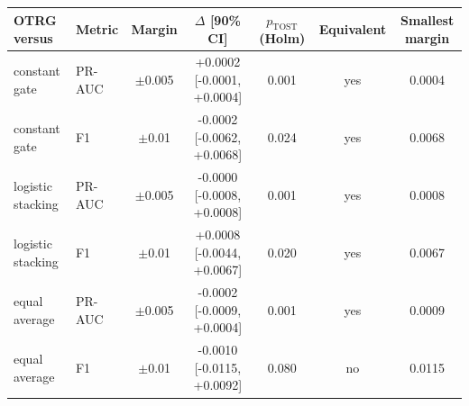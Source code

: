 \begin{tabular}{llccccc}
\toprule
OTRG versus & Metric & Margin & $\Delta$ [90\% CI] & $p_{\mathrm{TOST}}$ (Holm) & Equivalent & Smallest margin \\
\midrule
constant gate & PR-AUC & $\pm$0.005 & +0.0002 [-0.0001, +0.0004] & 0.001 & yes & 0.0004 \\
constant gate & F1 & $\pm$0.01 & -0.0002 [-0.0062, +0.0068] & 0.024 & yes & 0.0068 \\
logistic stacking & PR-AUC & $\pm$0.005 & -0.0000 [-0.0008, +0.0008] & 0.001 & yes & 0.0008 \\
logistic stacking & F1 & $\pm$0.01 & +0.0008 [-0.0044, +0.0067] & 0.020 & yes & 0.0067 \\
equal average & PR-AUC & $\pm$0.005 & -0.0002 [-0.0009, +0.0004] & 0.001 & yes & 0.0009 \\
equal average & F1 & $\pm$0.01 & -0.0010 [-0.0115, +0.0092] & 0.080 & no & 0.0115 \\
\bottomrule
\end{tabular}
